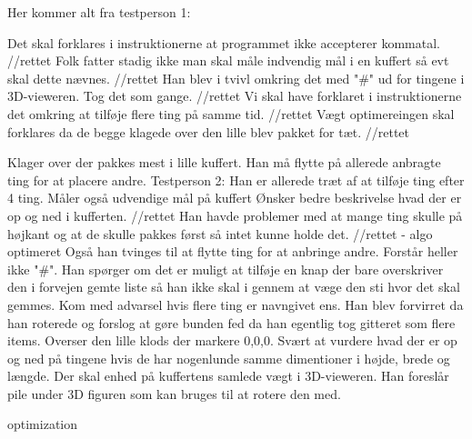 Her kommer alt fra testperson 1:


Det skal forklares i instruktionerne at programmet ikke accepterer kommatal. //rettet
Folk fatter stadig ikke man skal måle indvendig mål i en kuffert så evt skal dette nævnes. //rettet
Han blev i tvivl omkring det med "#" ud for tingene i 3D-vieweren. Tog det som gange. //rettet
Vi skal have forklaret i instruktionerne det omkring at tilføje flere ting på samme tid. //rettet
Vægt optimereingen skal forklares da de begge klagede over den lille blev pakket for tæt. //rettet

Klager over der pakkes mest i lille kuffert.
Han må flytte på allerede anbragte ting for at placere andre.
Testperson 2:
Han er allerede træt af at tilføje ting efter 4 ting.
Måler også udvendige mål på kuffert
Ønsker bedre beskrivelse hvad der er op og ned i kufferten. //rettet
Han havde problemer med at mange ting skulle på højkant og at de skulle pakkes først så intet kunne holde det. //rettet - algo optimeret
Også han tvinges til at flytte ting for at anbringe andre.
Forstår heller ikke "#".
Han spørger om det er muligt at tilføje en knap der bare overskriver den i forvejen gemte liste så han ikke skal i gennem at væge den sti hvor det skal gemmes.
Kom med advarsel hvis flere ting er navngivet ens.
Han blev forvirret da han roterede og forslog at gøre bunden fed da han egentlig tog gitteret som flere items.
Overser den lille klods der markere 0,0,0.
Svært at vurdere hvad der er op og ned på tingene hvis de har nogenlunde samme dimentioner i højde, brede og længde.
Der skal enhed på kuffertens samlede vægt i 3D-vieweren.
Han foreslår pile under 3D figuren som kan bruges til at rotere den med.

optimization 
